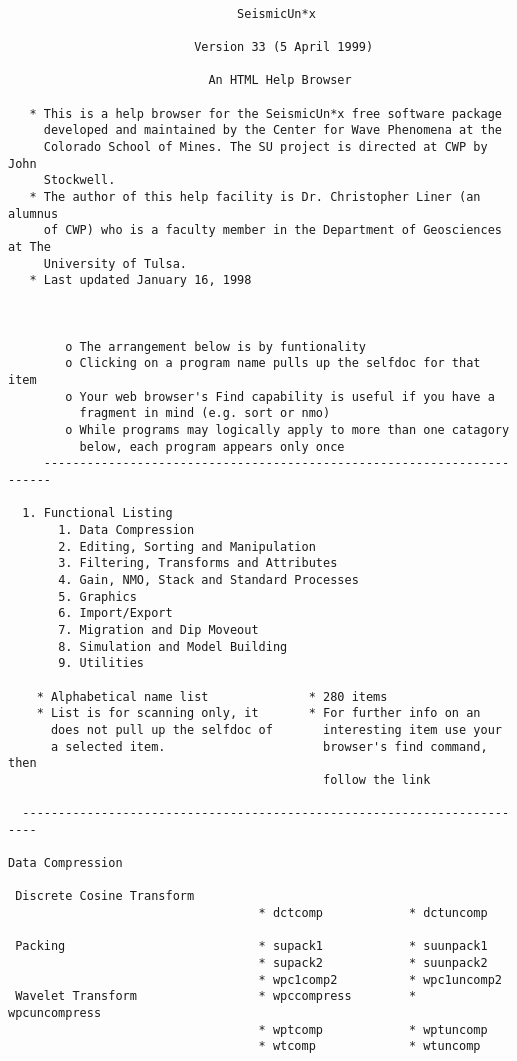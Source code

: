 
{\small\begin{verbatim}

                                SeismicUn*x

                          Version 33 (5 April 1999)

                            An HTML Help Browser

   * This is a help browser for the SeismicUn*x free software package
     developed and maintained by the Center for Wave Phenomena at the
     Colorado School of Mines. The SU project is directed at CWP by John
     Stockwell.
   * The author of this help facility is Dr. Christopher Liner (an alumnus
     of CWP) who is a faculty member in the Department of Geosciences at The
     University of Tulsa.
   * Last updated January 16, 1998



        o The arrangement below is by funtionality
        o Clicking on a program name pulls up the selfdoc for that item
        o Your web browser's Find capability is useful if you have a
          fragment in mind (e.g. sort or nmo)
        o While programs may logically apply to more than one catagory
          below, each program appears only once
     -----------------------------------------------------------------------

  1. Functional Listing
       1. Data Compression
       2. Editing, Sorting and Manipulation
       3. Filtering, Transforms and Attributes
       4. Gain, NMO, Stack and Standard Processes
       5. Graphics
       6. Import/Export
       7. Migration and Dip Moveout
       8. Simulation and Model Building
       9. Utilities

    * Alphabetical name list              * 280 items
    * List is for scanning only, it       * For further info on an
      does not pull up the selfdoc of       interesting item use your
      a selected item.                      browser's find command, then
                                            follow the link

  ------------------------------------------------------------------------

Data Compression

 Discrete Cosine Transform
                                   * dctcomp            * dctuncomp

 Packing                           * supack1            * suunpack1
                                   * supack2            * suunpack2
                                   * wpc1comp2          * wpc1uncomp2
 Wavelet Transform                 * wpccompress        * wpcuncompress
                                   * wptcomp            * wptuncomp
                                   * wtcomp             * wtuncomp


\end{verbatim}}
